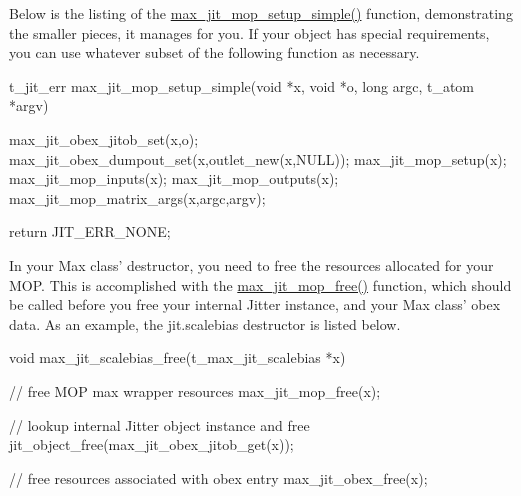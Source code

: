 Below is the listing of the \hyperlink{group__maxmopmod_gac3eaca207281516b72e81f0dc5f4bf94}{max\_\-jit\_\-mop\_\-setup\_\-simple()} function, demonstrating the smaller pieces, it manages for you. If your object has special requirements, you can use whatever subset of the following function as necessary.


\begin{DoxyCode}
t_jit_err max_jit_mop_setup_simple(void *x, void *o, long argc, t_atom *argv)
{
   max_jit_obex_jitob_set(x,o);
   max_jit_obex_dumpout_set(x,outlet_new(x,NULL));
   max_jit_mop_setup(x);
   max_jit_mop_inputs(x);
   max_jit_mop_outputs(x);
   max_jit_mop_matrix_args(x,argc,argv);

   return JIT_ERR_NONE;
}
\end{DoxyCode}


In your Max class' destructor, you need to free the resources allocated for your MOP. This is accomplished with the \hyperlink{group__maxmopmod_ga441ff70d705e1eccff8297437c85e46c}{max\_\-jit\_\-mop\_\-free()} function, which should be called before you free your internal Jitter instance, and your Max class' obex data. As an example, the jit.scalebias destructor is listed below.


\begin{DoxyCode}
void max_jit_scalebias_free(t_max_jit_scalebias *x)
{
   // free MOP max wrapper resources
   max_jit_mop_free(x);

   // lookup internal Jitter object instance and free
   jit_object_free(max_jit_obex_jitob_get(x));

   
   // free resources associated with obex entry
   max_jit_obex_free(x);
}
\end{DoxyCode}
 